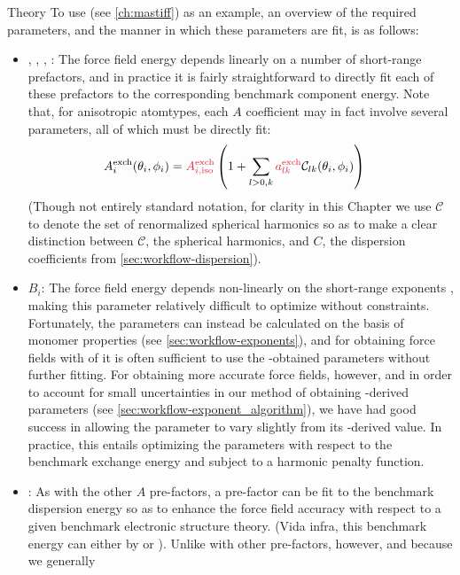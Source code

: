 \begin{subsection}{Theory}
To use \mastiff (see \cref{ch:mastiff}) as an example, an overview of the
required parameters, and
the manner in which these parameters are fit, is as follows:
\begin{itemize}
\item \textcolor{fit}{, , , }: 
The force field energy depends linearly on a number of short-range prefactors, and
in practice it is fairly straightforward to directly fit each of these
prefactors to the corresponding benchmark \sapt component energy. Note that, for anisotropic atomtypes,
each $A$ coefficient may in fact involve several parameters, all of which must
be directly fit:
\begin{align}
\label{eq:pointer-anisotropy}
\Aex{i}(\theta_i,\phi_i) &=
\textcolor{fit}{\Aex{i,\text{iso}}}\left(1 + 
\sum\limits_{l>0,k} \textcolor{fit}{\aex}  \mathcal{C}_{lk}(\theta_i,\phi_i)
\right)
\end{align}
(Though not entirely standard notation,\cite{stone2013theory}
for clarity in this Chapter we use
$\mathcal{C}$ to denote the set of renormalized spherical harmonics so as to
make a clear distinction between $\mathcal{C}$, the spherical harmonics, and
$C$, the dispersion coefficients from \cref{sec:workflow-dispersion}).
%
\item \textcolor{cfit}{$B_i$}:
The force field energy depends non-linearly on the short-range exponents \B,
making this parameter relatively difficult to optimize without constraints.
Fortunately, the \B parameters can
instead be calculated on the basis of monomer properties (see
\cref{sec:workflow-exponents}), and for obtaining force fields with
\rmse of  it is often sufficient to use the \isa-obtained \B
parameters without further fitting. For obtaining more accurate force fields,
however, and in order to account for small uncertainties in our method of
obtaining \isa-derived \B parameters (see
\cref{sec:workflow-exponent_algorithm}), we have had good success in allowing the
\B parameter to vary slightly from its \isa-derived value. In practice, this entails
optimizing the \B parameters with respect to the benchmark \sapt exchange energy and subject
to a harmonic penalty function.\cite{Misquitta2016}
%
\item \textcolor{cfit}{}:
As with the other $A$ pre-factors, a pre-factor can be fit to the benchmark dispersion
energy so as to enhance the force field accuracy with respect to a given
benchmark electronic structure theory. (Vida infra, this benchmark energy can
either by \dftsapt or \ccsdt). Unlike with other pre-factors, however, and because we generally

\end{itemize}
\end{subsection}
